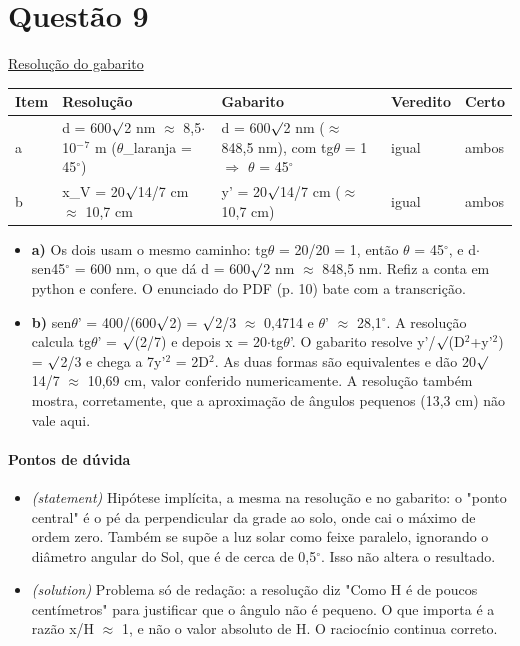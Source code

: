 \documentclass{article}%
\begin{document}
\section*{Questão 9}%
\href{https://poliedroresolve.sistemapoliedro.com.br/vestibulares/ita/2026/ita-2-fase-dia-3-30-10-2025-2-fase-dia-3/dissertativa-9-fisica-2-fase-dia-3-ita-2026}{Resolução do gabarito}\par\smallskip%
\begin{longtable}{@{}p{} p{} p{} p{} p{}@{}}\toprule Item & Resolução & Gabarito & Veredito & Certo \\ \midrule
a & d = 600$\surd$2 nm $\approx$ 8,5$\cdot$10$^{-}$$^{7}$ m ($\theta$\_laranja = 45$^\circ$) & d = 600$\surd$2 nm ($\approx$ 848,5 nm), com tg$\theta$ = 1 $\Rightarrow$ $\theta$ = 45$^\circ$ & igual & ambos \\
b & x\_V = 20$\surd$14/7 cm $\approx$ 10,7 cm & y' = 20$\surd$14/7 cm ($\approx$ 10,7 cm) & igual & ambos \\
\bottomrule\end{longtable}%
\begin{itemize}%
\item%
\textbf{a)} Os dois usam o mesmo caminho: tg$\theta$ = 20/20 = 1, então $\theta$ = 45$^\circ$, e d$\cdot$sen45$^\circ$ = 600 nm, o que dá d = 600$\surd$2 nm $\approx$ 848,5 nm. Refiz a conta em python e confere. O enunciado do PDF (p. 10) bate com a transcrição.%
\item%
\textbf{b)} sen$\theta$' = 400/(600$\surd$2) = $\surd$2/3 $\approx$ 0,4714 e $\theta$' $\approx$ 28,1$^\circ$. A resolução calcula tg$\theta$' = $\surd$(2/7) e depois x = 20$\cdot$tg$\theta$'. O gabarito resolve y'/$\surd$(D$^2$+y'$^2$) = $\surd$2/3 e chega a 7y'$^2$ = 2D$^2$. As duas formas são equivalentes e dão 20$\surd$14/7 $\approx$ 10,69 cm, valor conferido numericamente. A resolução também mostra, corretamente, que a aproximação de ângulos pequenos (13,3 cm) não vale aqui.%
\end{itemize}%
\paragraph{Pontos de dúvida}%
\begin{itemize}%
\item%
\textit{(statement)} Hipótese implícita, a mesma na resolução e no gabarito: o "ponto central" é o pé da perpendicular da grade ao solo, onde cai o máximo de ordem zero. Também se supõe a luz solar como feixe paralelo, ignorando o diâmetro angular do Sol, que é de cerca de 0,5$^\circ$. Isso não altera o resultado.%
\item%
\textit{(solution)} Problema só de redação: a resolução diz "Como H é de poucos centímetros" para justificar que o ângulo não é pequeno. O que importa é a razão x/H $\approx$ 1, e não o valor absoluto de H. O raciocínio continua correto.%
\end{itemize}%
\end{document}
